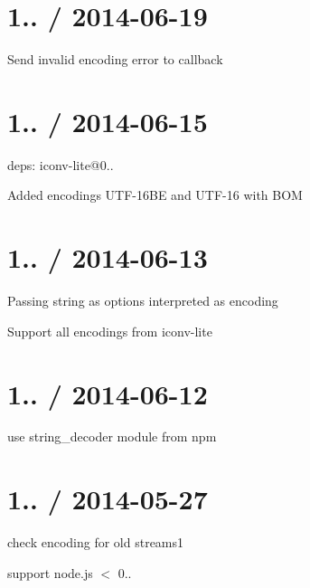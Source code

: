 \section*{1.. / 2014-\/06-\/19 }


\begin{DoxyItemize}
\item Send invalid encoding error to callback
\end{DoxyItemize}

\section*{1.. / 2014-\/06-\/15 }


\begin{DoxyItemize}
\item deps\+: iconv-\/lite@0..
\begin{DoxyItemize}
\item Added encodings U\+T\+F-\/16\+BE and U\+T\+F-\/16 with B\+OM
\end{DoxyItemize}
\end{DoxyItemize}

\section*{1.. / 2014-\/06-\/13 }


\begin{DoxyItemize}
\item Passing string as {\ttfamily options} interpreted as encoding
\item Support all encodings from {\ttfamily iconv-\/lite}
\end{DoxyItemize}

\section*{1.. / 2014-\/06-\/12 }


\begin{DoxyItemize}
\item use {\ttfamily string\+\_\+decoder} module from npm
\end{DoxyItemize}

\section*{1.. / 2014-\/05-\/27 }


\begin{DoxyItemize}
\item check encoding for old streams1
\item support node.\+js $<$ 0..
\end{DoxyItemize}

